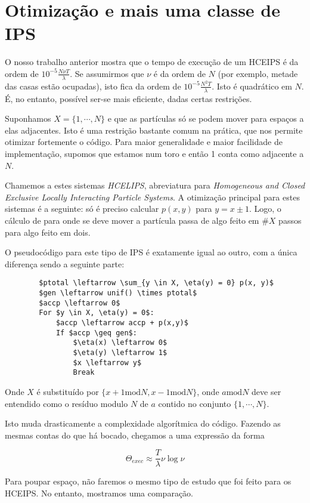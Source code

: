 \documentclass{article}
\renewcommand{\mod}{\mathbin{\mathrm{mod}}}
\begin{document}
	\section{Otimização e mais uma classe de IPS}
	
	O nosso trabalho anterior mostra que o tempo de execução de um HCEIPS é da ordem de $10^{-5} \frac{N \nu T}\lambda$. Se assumirmos que $\nu$ é da ordem de $N$ (por exemplo, metade das casas estão ocupadas), isto fica da ordem de $10^{-5} \frac{N^2 T}\lambda$. Isto é quadrático em $N$. É, no entanto, possível ser-se mais eficiente, dadas certas restrições.
	
	Suponhamos $X = \{1,\cdots, N\}$ e que as partículas só se podem mover para espaços a elas adjacentes. Isto é uma restrição bastante comum na prática, que nos permite otimizar fortemente o código. Para maior generalidade e maior facilidade de implementação, supomos que estamos num toro e então 1 conta como adjacente a $N$.
	
	Chamemos a estes sistemas \emph{HCELIPS}, abreviatura para \emph{Homogeneous and Closed Exclusive Locally Interacting Particle Systems}. A otimização principal para estes sistemas é a seguinte: só é preciso calcular $p(x,y)$ para $y = x \pm 1$. Logo, o cálculo de para onde se deve mover a partícula passa de algo feito em $\#X$ passos para algo feito em dois.
	
	O pseudocódigo para este tipo de IPS é exatamente igual ao outro, com a única diferença sendo a seguinte parte:
	
	\begin{lstlisting}
		$ptotal \leftarrow \sum_{y \in X, \eta(y) = 0} p(x, y)$
		$gen \leftarrow unif() \times ptotal$
		$accp \leftarrow 0$
		For $y \in X, \eta(y) = 0$:
			$accp \leftarrow accp + p(x,y)$
			If $accp \geq gen$:
				$\eta(x) \leftarrow 0$
				$\eta(y) \leftarrow 1$
				$x \leftarrow y$
				Break
	\end{lstlisting}
	
	Onde $X$ é substituído por $\{x+1 \mod N, x-1 \mod N\}$, onde $a \mod N$ deve ser entendido como o resíduo modulo $N$ de $a$ contido no conjunto $\{1, \cdots, N\}$.
	
	Isto muda drasticamente a complexidade algorítmica do código. Fazendo as mesmas contas do que há bocado, chegamos a uma expressão da forma
	
	\[\Theta_{exec} \approx \frac T \lambda \nu \log \nu\]
	
	Para poupar espaço, não faremos o mesmo tipo de estudo que foi feito para os HCEIPS. No entanto, mostramos uma comparação.
	
\end{document}
